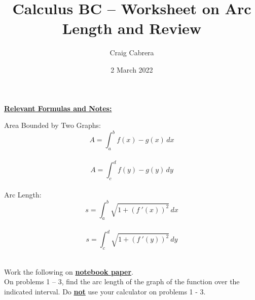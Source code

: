 \documentclass[10pt,letterpaper]{report}
\title{Calculus BC -- Worksheet on Arc Length and Review }
\author{Craig Cabrera}
\date{2 March 2022}
\begin{document}
\maketitle
\begin{center}
  \textbf{\underline{Relevant Formulas and Notes:}}
\end{center}

Area Bounded by Two Graphs: \\
$$A=\int_{a}^{b}{f(x)-g(x)}\,dx$$ \\

$$A=\int_{c}^{d}{f(y)-g(y)}\,dy$$ \\

Arc Length: \\
$$s=\int _a^b\sqrt{1+\left(f\:'\left(x\right)\right)^{2}}\,dx$$ \\

$$s=\int _c^d\sqrt{1+\left(f\:'\left(y\right)\right)^{2}}\,dy$$ \\

\pagebreak 


\noindent Work the following on \textbf{\underline{notebook paper}}. \\
\noindent On problems 1 -- 3, find the arc length of the graph of the function over the indicated interval. Do \textbf{\underline{not}} use your calculator on problems 1 - 3. \\
\end{document}
